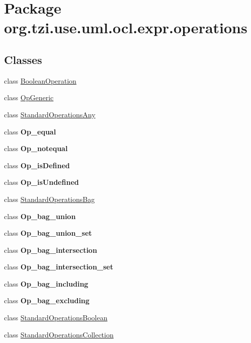 \hypertarget{namespaceorg_1_1tzi_1_1use_1_1uml_1_1ocl_1_1expr_1_1operations}{\section{Package org.\-tzi.\-use.\-uml.\-ocl.\-expr.\-operations}
\label{namespaceorg_1_1tzi_1_1use_1_1uml_1_1ocl_1_1expr_1_1operations}
}
\subsection*{Classes}
\begin{DoxyCompactItemize}
\item 
class \hyperlink{classorg_1_1tzi_1_1use_1_1uml_1_1ocl_1_1expr_1_1operations_1_1_boolean_operation}{Boolean\-Operation}
\item 
class \hyperlink{classorg_1_1tzi_1_1use_1_1uml_1_1ocl_1_1expr_1_1operations_1_1_op_generic}{Op\-Generic}
\item 
class \hyperlink{classorg_1_1tzi_1_1use_1_1uml_1_1ocl_1_1expr_1_1operations_1_1_standard_operations_any}{Standard\-Operations\-Any}
\item 
class {\bfseries Op\-\_\-equal}
\item 
class {\bfseries Op\-\_\-notequal}
\item 
class {\bfseries Op\-\_\-is\-Defined}
\item 
class {\bfseries Op\-\_\-is\-Undefined}
\item 
class \hyperlink{classorg_1_1tzi_1_1use_1_1uml_1_1ocl_1_1expr_1_1operations_1_1_standard_operations_bag}{Standard\-Operations\-Bag}
\item 
class {\bfseries Op\-\_\-bag\-\_\-union}
\item 
class {\bfseries Op\-\_\-bag\-\_\-union\-\_\-set}
\item 
class {\bfseries Op\-\_\-bag\-\_\-intersection}
\item 
class {\bfseries Op\-\_\-bag\-\_\-intersection\-\_\-set}
\item 
class {\bfseries Op\-\_\-bag\-\_\-including}
\item 
class {\bfseries Op\-\_\-bag\-\_\-excluding}
\item 
class \hyperlink{classorg_1_1tzi_1_1use_1_1uml_1_1ocl_1_1expr_1_1operations_1_1_standard_operations_boolean}{Standard\-Operations\-Boolean}
\item 
class \hyperlink{classorg_1_1tzi_1_1use_1_1uml_1_1ocl_1_1expr_1_1operations_1_1_standard_operations_collection}{Standard\-Operations\-Collection}

\end{DoxyCompactItemize}
